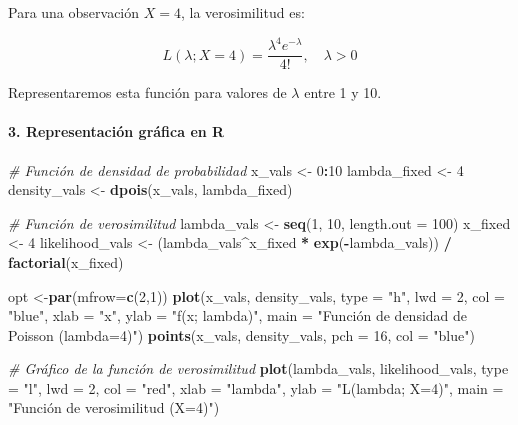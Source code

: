 \documentclass[
]{article}
\newenvironment{Shaded}{\begin{snugshade}}{\end{snugshade}}
\newcommand{\AttributeTok}[1]{\textcolor[rgb]{0.13,0.29,0.53}{#1}}
\newcommand{\CommentTok}[1]{\textcolor[rgb]{0.56,0.35,0.01}{\textit{#1}}}
\newcommand{\DecValTok}[1]{\textcolor[rgb]{0.00,0.00,0.81}{#1}}
\newcommand{\FunctionTok}[1]{\textcolor[rgb]{0.13,0.29,0.53}{\textbf{#1}}}
\newcommand{\NormalTok}[1]{#1}
\newcommand{\OtherTok}[1]{\textcolor[rgb]{0.56,0.35,0.01}{#1}}
\newcommand{\SpecialCharTok}[1]{\textcolor[rgb]{0.81,0.36,0.00}{\textbf{#1}}}
\newcommand{\StringTok}[1]{\textcolor[rgb]{0.31,0.60,0.02}{#1}}
\begin{document}
Para una observación \(X = 4\), la verosimilitud es:

\[
L(\lambda; X = 4) = \frac{\lambda^4 e^{-\lambda}}{4!}, \quad \lambda > 0
\]

Representaremos esta función para valores de \(\lambda\) entre 1 y 10.

\paragraph{3. Representación gráfica en R}\label{representaciuxf3n-gruxe1fica-en-r}

\begin{Shaded}
\begin{Highlighting}[]
\CommentTok{\# Función de densidad de probabilidad}
\NormalTok{x\_vals }\OtherTok{\textless{}{-}} \DecValTok{0}\SpecialCharTok{:}\DecValTok{10}
\NormalTok{lambda\_fixed }\OtherTok{\textless{}{-}} \DecValTok{4}
\NormalTok{density\_vals }\OtherTok{\textless{}{-}} \FunctionTok{dpois}\NormalTok{(x\_vals, lambda\_fixed)}

\CommentTok{\# Función de verosimilitud}
\NormalTok{lambda\_vals }\OtherTok{\textless{}{-}} \FunctionTok{seq}\NormalTok{(}\DecValTok{1}\NormalTok{, }\DecValTok{10}\NormalTok{, }\AttributeTok{length.out =} \DecValTok{100}\NormalTok{)}
\NormalTok{x\_fixed }\OtherTok{\textless{}{-}} \DecValTok{4}
\NormalTok{likelihood\_vals }\OtherTok{\textless{}{-}}\NormalTok{ (lambda\_vals}\SpecialCharTok{\^{}}\NormalTok{x\_fixed }\SpecialCharTok{*} \FunctionTok{exp}\NormalTok{(}\SpecialCharTok{{-}}\NormalTok{lambda\_vals)) }\SpecialCharTok{/} \FunctionTok{factorial}\NormalTok{(x\_fixed)}

\NormalTok{opt }\OtherTok{\textless{}{-}}\FunctionTok{par}\NormalTok{(}\AttributeTok{mfrow=}\FunctionTok{c}\NormalTok{(}\DecValTok{2}\NormalTok{,}\DecValTok{1}\NormalTok{))}
\FunctionTok{plot}\NormalTok{(x\_vals, density\_vals, }
     \AttributeTok{type =} \StringTok{"h"}\NormalTok{, }\AttributeTok{lwd =} \DecValTok{2}\NormalTok{, }\AttributeTok{col =} \StringTok{"blue"}\NormalTok{,}
     \AttributeTok{xlab =} \StringTok{"x"}\NormalTok{, }\AttributeTok{ylab =} \StringTok{"f(x; lambda)"}\NormalTok{,}
     \AttributeTok{main =} \StringTok{"Función de densidad de Poisson (lambda=4)"}\NormalTok{)}
\FunctionTok{points}\NormalTok{(x\_vals, density\_vals, }\AttributeTok{pch =} \DecValTok{16}\NormalTok{, }\AttributeTok{col =} \StringTok{"blue"}\NormalTok{)}


\CommentTok{\# Gráfico de la función de verosimilitud}
\FunctionTok{plot}\NormalTok{(lambda\_vals, likelihood\_vals, }\AttributeTok{type =} \StringTok{"l"}\NormalTok{, }\AttributeTok{lwd =} \DecValTok{2}\NormalTok{, }\AttributeTok{col =} \StringTok{"red"}\NormalTok{,}
     \AttributeTok{xlab =} \StringTok{"lambda"}\NormalTok{, }\AttributeTok{ylab =} \StringTok{"L(lambda; X=4)"}\NormalTok{, }\AttributeTok{main =} \StringTok{"Función de verosimilitud (X=4)"}\NormalTok{)}
\end{Highlighting}
\end{Shaded}
\end{document}

